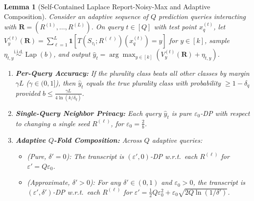 \documentclass[11pt]{article}
\newtheorem{lemma}{Lemma}
\theoremstyle{definition}
\newcommand{\Lap}{\operatorname{Lap}}
\begin{document}
\begin{lemma}[Self-Contained Laplace Report-Noisy-Max and Adaptive Composition]
\label{lem:composition}
Consider an adaptive sequence of $Q$ prediction queries interacting with $\mathbf{R} = (R^{(1)}, \dots, R^{(L)})$. On query $t \in [Q]$ with test point $x_q^{(t)}$, let $V_y^{(t)}(\mathbf{R}) = \sum_{\ell=1}^L \mathbf{1}[T(S_{\tau_t}; R^{(\ell)})(x_q^{(t)}) = y]$ for $y \in [k]$, sample $\eta_{t, y} \stackrel{\text{i.i.d.}}{\sim} \Lap(b)$, and output $\hat{y}_t = \arg\max_{y \in [k]} (V_y^{(t)}(\mathbf{R}) + \eta_{t, y})$.
\begin{enumerate}[leftmargin=1.5em,itemsep=2pt]
    \item \textbf{Per-Query Accuracy:} If the plurality class beats all other classes by margin $\gamma L$ ($\gamma \in (0, 1]$), then $\hat{y}_t$ equals the true plurality class with probability $\ge 1 - \delta_q$ provided $b \le \frac{\gamma L}{4 \ln(k/\delta_q)}$.
    \item \textbf{Single-Query Neighbor Privacy:} Each query $\hat{y}_t$ is pure $\varepsilon_0$-DP with respect to changing a single seed $R^{(\ell)}$, for $\varepsilon_0 = \frac{2}{b}$.
    \item \textbf{Adaptive $Q$-Fold Composition:} Across $Q$ adaptive queries:
    \begin{itemize}[leftmargin=1.2em]
        \item \emph{(Pure, $\delta'=0$):} The transcript is $(\varepsilon', 0)$-DP w.r.t.\ each $R^{(\ell)}$ for $\varepsilon' = Q \varepsilon_0$.
        \item \emph{(Approximate, $\delta' > 0$):} For any $\delta' \in (0, 1)$ and $\varepsilon_0 > 0$, the transcript is $(\varepsilon', \delta')$-DP w.r.t.\ each $R^{(\ell)}$ for $\varepsilon' = \frac{1}{2} Q \varepsilon_0^2 + \varepsilon_0 \sqrt{2 Q \ln(1/\delta')}$.
    \end{itemize}
\end{enumerate}
\end{lemma}
\end{document}

